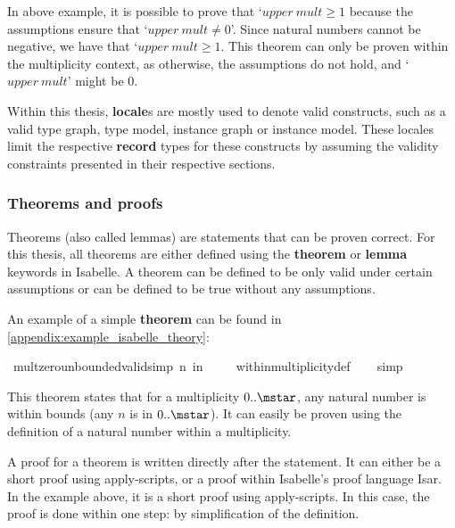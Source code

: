 In above example, it is possible to prove that `$upper\ mult \geq 1$ because the assumptions ensure that `$upper\ mult \not= 0$'. Since natural numbers cannot be negative, we have that `$upper\ mult \geq 1$. This theorem can only be proven within the multiplicity context, as otherwise, the assumptions do not hold, and `$upper\ mult$' might be $0$.

Within this thesis, \textbf{locale}s are mostly used to denote valid constructs, such as a valid type graph, type model, instance graph or instance model. These locales limit the respective \textbf{record} types for these constructs by assuming the validity constraints presented in their respective sections.

\subsubsection{Theorems and proofs}
Theorems (also called lemmas) are statements that can be proven correct. For this thesis, all theorems are either defined using the \textbf{theorem} or \textbf{lemma} keywords in Isabelle. A theorem can be defined to be only valid under certain assumptions or can be defined to be true without any assumptions.

An example of a simple \textbf{theorem} can be found in \cref{appendix:example_isabelle_theory}:
\vspace{1em}\begin{isabellebody}
\isamarkupfalse%
\ mult{\isacharunderscore}zero{\isacharunderscore}unbounded{\isacharunderscore}valid{\isacharbrackleft}simp{\isacharbrackright}{\isacharcolon}\ {\isachardoublequoteopen}n\ in\ \isactrlemph {\isachardoublequoteclose}\isanewline
%
\isadelimproof
\ \ %
\endisadelimproof
%
\isatagproof
{}\isamarkupfalse%
\ within{\isacharunderscore}multiplicity{\isacharunderscore}def\isanewline
\ \ \isamarkupfalse%
\ simp%
\endisatagproof
{\isafoldproof}%
%
\isadelimproof
\end{isabellebody}

This theorem states that for a multiplicity $0..\mstar$, any natural number is within bounds (any $n$ is in $0..\mstar$). It can easily be proven using the definition of a natural number within a multiplicity.

A proof for a theorem is written directly after the statement. It can either be a short proof using apply-scripts, or a proof within Isabelle's proof language Isar. In the example above, it is a short proof using apply-scripts. In this case, the proof is done within one step: by simplification of the definition.

